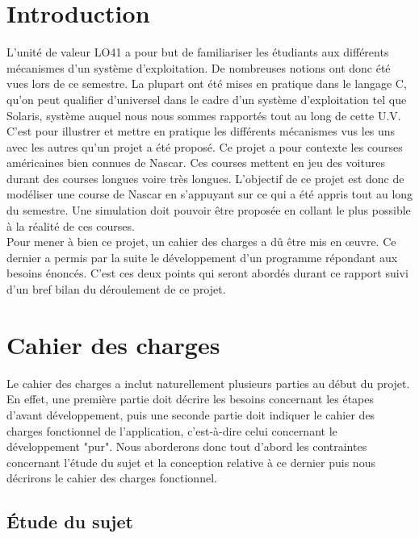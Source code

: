 \documentclass[a4paper, 11pt]{report}
\begin{document}
	\newpage
	
	
	
	\chapter*{Introduction}
	
	L'unité de valeur LO41 a pour but de familiariser les étudiants aux différents mécanismes d'un système d'exploitation. De nombreuses notions ont donc été vues lors de ce semestre. La plupart ont été mises en pratique dans le langage C, qu'on peut qualifier d'universel dans le cadre d'un système d'exploitation tel que Solaris, système auquel nous nous sommes rapportés tout au long de cette U.V. C'est pour illustrer et mettre en pratique les différents mécanismes vus les uns avec les autres qu'un projet a été proposé. Ce projet a pour contexte les courses américaines bien connues de Nascar. Ces courses mettent en jeu des voitures durant des courses longues voire très longues. L'objectif de ce projet est donc de modéliser une course de Nascar en s'appuyant sur ce qui a été appris tout au long du semestre. Une simulation doit pouvoir être proposée en collant le plus possible à la réalité de ces courses. \\
	Pour mener à bien ce projet, un cahier des charges a dû être mis en œuvre. Ce dernier a permis par la suite le développement d'un programme répondant aux besoins énoncés. C'est ces deux points qui seront abordés durant ce rapport suivi d'un bref bilan du déroulement de ce projet.
	
	
	\newpage
	
	\chapter{Cahier des charges}
	
	Le cahier des charges a inclut naturellement plusieurs parties au début du projet. En effet, une première partie doit décrire les besoins concernant les étapes d'avant développement, puis une seconde partie doit indiquer le cahier des charges fonctionnel de l'application, c'est-à-dire celui concernant le développement "pur". Nous aborderons donc tout d'abord les contraintes concernant l'étude du sujet et la conception relative à ce dernier puis nous décrirons le cahier des charges fonctionnel.
	
		\section{Étude du sujet}
		
\end{document}
